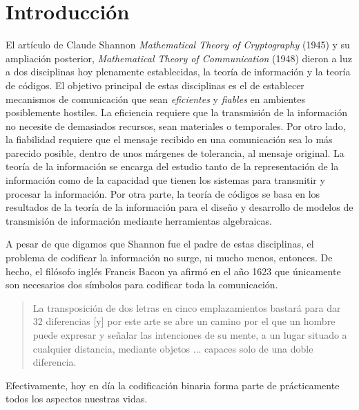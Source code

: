 \chapter*{Introducción}
 
El artículo de Claude Shannon \textit{Mathematical Theory of Cryptography} (1945) y su ampliación posterior, \textit{Mathematical Theory of Communication} (1948) dieron a luz a dos disciplinas hoy plenamente establecidas, la teoría de información y la teoría de códigos.
El objetivo principal de estas disciplinas es el de establecer mecanismos de comunicación que sean \emph{eficientes} y \emph{fiables} en ambientes posiblemente hostiles.
La eficiencia requiere que la transmisión de la información no necesite de demasiados recursos, sean materiales o temporales.
Por otro lado, la fiabilidad requiere que el mensaje recibido en una comunicación sea lo más parecido posible, dentro de unos márgenes de tolerancia, al mensaje original.
La teoría de la información se encarga del estudio tanto de la representación de la información como de la capacidad que tienen los sistemas para transmitir y procesar la información. 
Por otra parte, la teoría de códigos se basa en los resultados de la teoría de la información para el diseño y desarrollo de modelos de transmisión de información mediante herramientas algebraicas.

A pesar de que digamos que Shannon fue el padre de estas disciplinas, el problema de codificar la información no surge, ni mucho menos, entonces.
De hecho, el filósofo inglés Francis Bacon ya afirmó en el año 1623 que únicamente son necesarios dos símbolos para codificar toda la comunicación.
\blockquote[{\cite[30]{dyson_catedral_2015}}]{La transposición de dos letras en cinco emplazamientos bastará para dar 32 diferencias [y] por este arte se abre un camino por el que un hombre puede expresar y señalar las intenciones de su mente, a un lugar situado a cualquier distancia, mediante objetos ... capaces solo de una doble diferencia.}
Efectivamente, hoy en día la codificación binaria forma parte de prácticamente todos los aspectos nuestras vidas.

